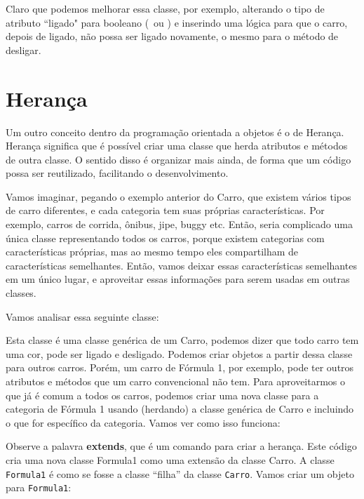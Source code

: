 

Claro que podemos melhorar essa classe, por exemplo, alterando o tipo de atributo 
``ligado" para booleano (\true~ou \false) e inserindo uma lógica para que o carro, depois 
de ligado, não possa ser ligado novamente, o mesmo para o método de desligar.



\section{Herança}
\label{heranca}

Um outro conceito dentro da programação orientada a objetos é o de Herança. Herança 
significa que é possível criar uma classe que herda atributos e métodos de outra classe. 
O sentido disso é organizar mais ainda, de forma que um código possa ser reutilizado, 
facilitando o desenvolvimento. 

Vamos imaginar, pegando o exemplo anterior do Carro, que existem vários tipos de carro 
diferentes, e cada categoria tem suas próprias características. Por exemplo, carros de 
corrida, ônibus, jipe, buggy etc. Então, seria complicado uma única classe representando 
todos os carros, porque existem categorias com características próprias, mas ao mesmo 
tempo eles compartilham de características semelhantes. Então, vamos deixar essas 
características semelhantes em um único lugar, e aproveitar essas informações para serem 
usadas em outras classes.

Vamos analisar essa seguinte classe:



Esta classe é uma classe genérica de um Carro, podemos dizer que todo carro tem uma cor, 
pode ser ligado e desligado. Podemos criar objetos a partir dessa classe para outros 
carros. Porém, um carro de Fórmula 1, por exemplo, pode ter outros atributos e métodos 
que um carro convencional não tem. Para aproveitarmos o que já é comum a todos os carros, 
podemos criar uma nova classe para a categoria de Fórmula 1 usando (herdando) a classe 
genérica de Carro e incluindo o que for específico da categoria. Vamos ver como isso 
funciona:



Observe a palavra \textbf{extends}, que é um comando para criar a herança. Este código 
cria uma nova classe Formula1 como uma extensão da classe Carro. A classe \texttt{Formula1} é como 
se fosse a classe ``filha'' da classe \texttt{Carro}. Vamos criar um objeto para \texttt{Formula1}:

